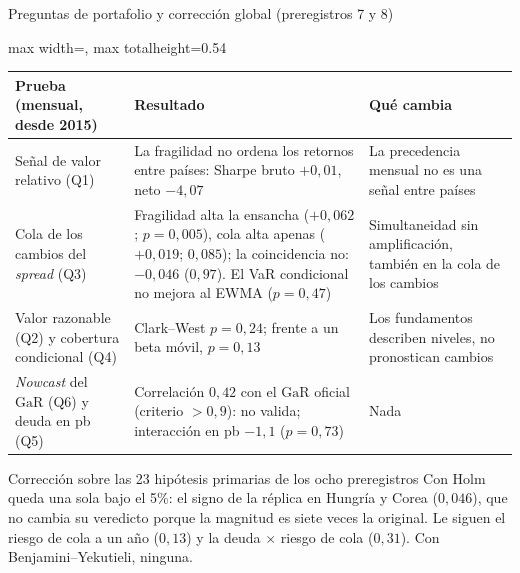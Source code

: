 \documentclass[aspectratio=169]{beamer}
\newcommand{\GaR}{\mathrm{GaR}}
\begin{document}
\begin{frame}{Preguntas de portafolio y corrección global (preregistros 7 y 8)}
\centering
\footnotesize
\begin{adjustbox}{max width=\textwidth, max totalheight=0.54\textheight}
\begin{tabular}{>{\raggedright\arraybackslash}p{}>{\raggedright\arraybackslash}p{}>{\raggedright\arraybackslash}p{}}
\toprule
Prueba (mensual, desde 2015) & Resultado & Qué cambia \\
\midrule
Señal de valor relativo (Q1) & La fragilidad no ordena los retornos entre países: Sharpe bruto $+0{,}01$, neto $-4{,}07$ & La precedencia mensual no es una señal entre países \\
\addlinespace
Cola de los cambios del \textit{spread} (Q3) & Fragilidad alta la ensancha ($+0{,}062$; $p=0{,}005$), cola alta apenas ($+0{,}019$; $0{,}085$); la coincidencia no: $-0{,}046$ ($0{,}97$). El VaR condicional no mejora al EWMA ($p=0{,}47$) & Simultaneidad sin amplificación, también en la cola de los cambios \\
\addlinespace
Valor razonable (Q2) y cobertura condicional (Q4) & Clark--West $p=0{,}24$; frente a un beta móvil, $p=0{,}13$ & Los fundamentos describen niveles, no pronostican cambios \\
\addlinespace
\textit{Nowcast} del $\GaR$ (Q6) y deuda en pb (Q5) & Correlación $0{,}42$ con el $\GaR$ oficial (criterio $>0{,}9$): no valida; interacción en pb $-1{,}1$ ($p=0{,}73$) & Nada \\
\bottomrule
\end{tabular}
\end{adjustbox}
\vspace{2pt}
\begin{block}{Corrección sobre las 23 hipótesis primarias de los ocho preregistros}
\scriptsize Con Holm queda una sola bajo el 5\%: el signo de la réplica en Hungría y Corea ($0{,}046$), que no cambia su veredicto porque la magnitud es siete veces la original. Le siguen el riesgo de cola a un año ($0{,}13$) y la deuda $\times$ riesgo de cola ($0{,}31$). Con Benjamini--Yekutieli, ninguna.
\end{block}
\end{frame}
\end{document}
